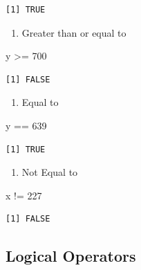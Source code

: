 \documentclass[
  letterpaper,
  DIV=11,
  numbers=noendperiod]{scrreprt}
\newenvironment{Shaded}{\begin{snugshade}}{\end{snugshade}}
\newcommand{\DecValTok}[1]{\textcolor[rgb]{0.68,0.00,0.00}{#1}}
\newcommand{\NormalTok}[1]{\textcolor[rgb]{0.00,0.23,0.31}{#1}}
\newcommand{\SpecialCharTok}[1]{\textcolor[rgb]{0.37,0.37,0.37}{#1}}
\providecommand{\tightlist}{%
  \setlength{\itemsep}{0pt}\setlength{\parskip}{0pt}}\usepackage{longtable,booktabs,array}
\begin{document}
\begin{verbatim}
[1] TRUE
\end{verbatim}

\begin{enumerate}
\def\labelenumi{\alph{enumi}.}
\setcounter{enumi}{3}
\tightlist
\item
  Greater than or equal to
\end{enumerate}

\begin{Shaded}
\begin{Highlighting}[]
\NormalTok{y }\SpecialCharTok{\textgreater{}=} \DecValTok{700}
\end{Highlighting}
\end{Shaded}

\begin{verbatim}
[1] FALSE
\end{verbatim}

\begin{enumerate}
\def\labelenumi{\alph{enumi}.}
\setcounter{enumi}{4}
\tightlist
\item
  Equal to
\end{enumerate}

\begin{Shaded}
\begin{Highlighting}[]
\NormalTok{y }\SpecialCharTok{==} \DecValTok{639}
\end{Highlighting}
\end{Shaded}

\begin{verbatim}
[1] TRUE
\end{verbatim}

\begin{enumerate}
\def\labelenumi{\alph{enumi}.}
\setcounter{enumi}{5}
\tightlist
\item
  Not Equal to
\end{enumerate}

\begin{Shaded}
\begin{Highlighting}[]
\NormalTok{x }\SpecialCharTok{!=} \DecValTok{227}
\end{Highlighting}
\end{Shaded}

\begin{verbatim}
[1] FALSE
\end{verbatim}

\subsection{Logical Operators}\label{logical-operators}
\end{document}
